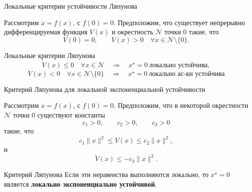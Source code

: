 \documentclass{beamer}
\begin{document}
	
	\begin{frame}{Локальные критерии устойчивости Ляпунова}
		\begin{flushleft}
			Рассмотрим \(\dot{x}=f(x)\), с \(f(0)=0\). Предположим, что существует непрерывно дифференцируемая функция \(V(x)\)
			и окрестность \(\mathcal{N}\) точки \(0\) такие, что
			\[
			V(0)=0,
			\qquad
			V(x)>0 \quad \forall x\in\mathcal{N}\setminus\{0\}.
			\]
			
			\hspace*{-0.5cm}
			\begin{minipage}{1.1\textwidth} 
				\begin{block}{Локальные критерии Ляпунова}
					\[
					\dot V(x)\leq0
					\quad \forall x\in\mathcal{N}
					\quad\Longrightarrow\quad
					x^\star=0\ \text{локально устойчива},
					\]
					\[
					\dot V(x)<0
					\quad \forall x\in\mathcal{N}\setminus\{0\}
					\quad\Longrightarrow\quad
					x^\star=0\ \text{локально ас-ки устойчива}
					\]
				\end{block}
			\end{minipage}
			
		\end{flushleft}
	\end{frame}
	
	
	
	\begin{frame}{Критерий Ляпунова для локальной экспоненциальной устойчивости}
		\begin{flushleft}
			Рассмотрим \(\dot{x}=f(x)\), с \(f(0)=0\). Предположим, что в некоторой окрестности \(\mathcal{N}\) точки \(0\) существуют
			константы
			\[
			c_1>0,\qquad c_2>0,\qquad c_3>0
			\]
			такие, что
			\[
			c_1\|x\|^2
			\leq
			V(x)
			\leq
			c_2\|x\|^2,
			\]
			и
			\[
			\dot V(x)
			\leq
			-c_3\|x\|^2.
			\]
			
			\begin{block}{Критерий Ляпунова}
				Если эти неравенства выполняются локально, то \(x^\star=0\) является
				\textbf{локально экспоненциально устойчивой}.
			\end{block}
			
		\end{flushleft}
	\end{frame}
	
	
	
\end{document}
